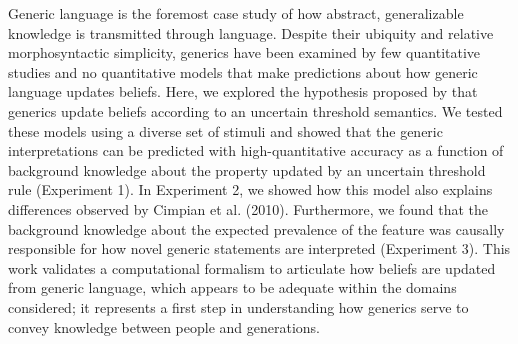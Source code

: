 \documentclass[floatsintext,doc]{apa6}
\begin{document}
Generic language is the foremost case study of how abstract, generalizable knowledge is transmitted through language.
Despite their ubiquity and relative morphosyntactic simplicity, generics have been examined by few quantitative studies and no quantitative models that make predictions about how generic language updates beliefs.
Here, we explored the hypothesis proposed by  that generics update beliefs according to an uncertain threshold semantics. 
We tested these models using a diverse set of stimuli and showed that the generic interpretations can be predicted with high-quantitative accuracy as a function of background knowledge about the property updated by an uncertain threshold rule (Experiment 1).
In Experiment 2, we showed how this model also explains differences observed by Cimpian et al. (2010).
Furthermore, we found that the background knowledge about the expected prevalence of the feature was causally responsible for how novel generic statements are interpreted (Experiment 3).
This work validates a computational formalism to articulate how beliefs are updated from generic language, which appears to be adequate within the domains considered; it represents a first step in understanding how generics serve to convey knowledge between people and generations.
\end{document}
